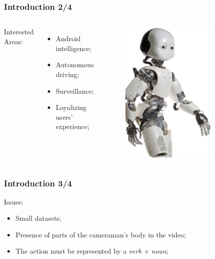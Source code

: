 \documentclass{beamer}
\begin{document}
\begin{frame}
\frametitle{Introduction 2/4}
\begin{columns}
Interested Areas:
\begin{itemize}
\item Android intelligence;
\item Autonomous driving;
\item Surveillance;
\item Loyalizing users' experience;
\end{itemize}
\begin{figure}
\includegraphics[width=0.8\textwidth]{../schemi/icub}
\end{figure}
\end{columns}
\end{frame}

\begin{frame}
\frametitle{Introduction 3/4}
Issues:
\begin{itemize}
\item Small datasets;
\item Presence of parts of the cameraman's body in the video;
\item The action must be represented by a \emph{verb + noun};
\end{itemize}
\end{frame}
\end{document}
